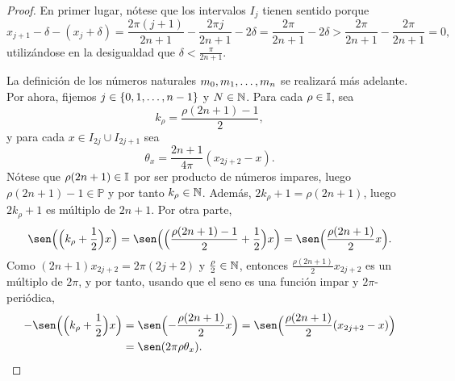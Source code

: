 \documentclass[a4paper, 12pt, oneside]{book}
\begin{document}
\begin{proof}
    En primer lugar, nótese que los intervalos $I_j$ tienen sentido porque
    \[x_{j+1}-\delta -(x_j+\delta) = \frac{2\pi(j+1)}{2n+1}-\frac{2\pi j}{2n+1} -2\delta = \frac{2\pi}{2n+1}-2\delta > \frac{2\pi}{2n+1}-\frac{2\pi}{2n+1} = 0,\]
    utilizándose en la desigualdad que $\delta < \frac{\pi}{2n+1}$.

    La definición de los números naturales $m_0,m_1,\mathellipsis,m_n$ se realizará más adelante. Por ahora, fijemos $j \in \{0,1,\mathellipsis,n-1\}$ y $N \in \mathbb N$. Para cada $\rho \in \mathbb I$, sea \[k_\rho = \frac{\rho(2n+1)-1}{2},\]
    y para cada $x \in I_{2j} \cup I_{2j+1}$ sea
    \[\theta_x = \frac{2n+1}{4\pi}(x_{2j+2}-x).\]
    Nótese que $\rho(2n+1) \in \mathbb I$ por ser producto de números impares, luego $\rho(2n+1)-1 \in \mathbb{P}$ y por tanto $k_\rho \in \mathbb N$. Además, $2k_\rho+1=\rho(2n+1)$, luego $2k_\rho+1$ es múltiplo de $2n+1$. Por otra parte,
    \[\sen\Bigl(\Bigl(k_\rho+\frac{1}{2}\Bigr)x\Bigr) = \sen\Bigl(\Bigl(\frac{\rho(2n+1)-1}{2}+\frac{1}{2}\Bigr)x\Bigr) = \sen\Bigl(\frac{\rho(2n+1)}{2}x\Bigr).\]
    Como $(2n+1)x_{2j+2} = 2\pi(2j+2)$ y $\frac{\rho}{2} \in \mathbb N$, entonces $\frac{\rho(2n+1)}{2}x_{2j+2}$ es un múltiplo de $2\pi$, y por tanto, usando que el seno es una función impar y $2\pi$-periódica,
    \begin{align}\label{2.2.5}
        -\sen\Bigl(\Bigl(k_\rho+\frac{1}{2}\Bigr)x\Bigr) &= \sen\Bigl(-\frac{\rho(2n+1)}{2}x\Bigr) = \sen\Bigl(\frac{\rho(2n+1)}{2}(x_{2j+2}-x)\Bigr) \notag \\ 
        &= \sen(2\pi \rho\theta_x).
    \end{align}
    

\end{proof}
\end{document}
